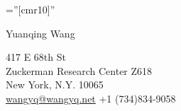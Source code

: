 \documentclass[letterpaper,10pt]{article}
\begin{document}

\pagestyle{empty} %

\font\fb=''[cmr10]'' %

\par{\centering
		{ \Huge  Yuanqing Wang
	}\bigskip\par}

\begin{center}

417 E 68th St\\
Zuckerman Research Center Z618\\
New York, N.Y. 10065\\
\href{mailto:wangyq@wangyq.net}{wangyq@wangyq.net} +1 (734)834-9058\\
\end{center}

\end{document}
